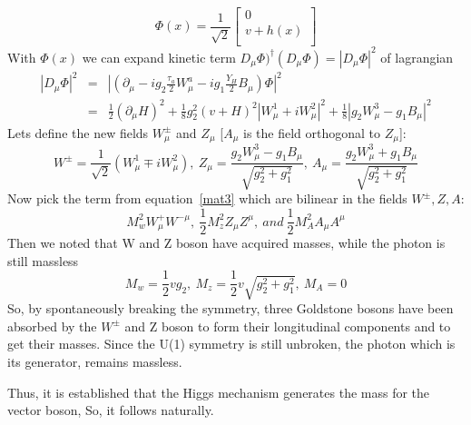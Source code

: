 \begin{equation}
    \Phi (x)=\frac{1}{\sqrt{2}}
        \begin{bmatrix}
        0   \\
        v+h(x)  \\
        \end{bmatrix}
\end{equation}
With $\Phi(x)$ we can expand kinetic term $D_\mu \Phi)^{\dagger} (D_\mu \Phi)=|D_\mu \Phi|^2$ of lagrangian
\begin{eqnarray}\label{mat3}
    |D_{\mu} \Phi|^2 & = & |(\partial_{\mu}-ig_2\frac{\tau_a}{2}W^a_{\mu}-ig_1 \frac{Y_H}{2}B_{\mu})\Phi|^2 \nonumber \\
            & = & \frac{1}{2}(\partial_\mu H)^2+\frac{1}{8}g^2_2(v+H)^2|W^1_{\mu}+iW^2_\mu|^2+\frac{1}{8}|g_2W^3_\mu-g_1B_\mu|^2
\end{eqnarray}
Lets define the new fields $W^{\pm}_\mu$ and $Z_\mu$ [$A_\mu$ is the field orthogonal to $Z_\mu$]:
\begin{equation}
    W^{\pm}=\frac{1}{\sqrt{2}}(W^1_\mu \mp iW^2_\mu),~Z_\mu=\frac{g_2W^3_\mu-g_1B_\mu}{\sqrt{g^2_2+g^2_1}},~A_\mu=\frac{g_2W^3_\mu+g_1B_\mu}{\sqrt{g^2_2+g^2_1}}
\end{equation}
Now pick the term from equation~\ref{mat3} which are bilinear in the fields $W^\pm,Z,A$:
\begin{equation}
    M^2_wW^+_\mu W^{-\mu},~\frac{1}{2}M^2_z Z_\mu Z^\mu,~and~\frac{1}{2}M^2_AA_\mu A^\mu
\end{equation}
Then we noted that W and Z boson have acquired masses, while the photon is still massless
\begin{equation}
    M_w=\frac{1}{2}vg_2,~M_z=\frac{1}{2}v\sqrt{g^2_2+g^2_1},~M_A=0
\end{equation}
So, by spontaneously breaking the symmetry, three Goldstone bosons have been absorbed by the $W^{\pm}$ and Z boson to form their longitudinal components and to get their masses. Since the U(1) symmetry is still unbroken, the photon which is its generator, remains massless.

Thus, it is established that the Higgs mechanism generates the mass for the vector boson, So, it follows naturally.


